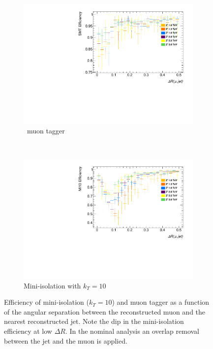 \begin{figure}[t]
\begin{subfigure}{0.49\linewidth}
  \centering
  \includegraphics[width=\textwidth]{PartBoosted/Plots/he_staco_smt_dr.pdf}
  \caption{\xsm\ muon tagger} \label{fig:BoostedSMTeffVsDRmuj}
\end{subfigure}
~
\begin{subfigure}{0.49\linewidth}
  \centering
  \includegraphics[width=\textwidth]{PartBoosted/Plots/he_muid_mi10_dr.pdf}
  \caption{Mini-isolation with $k_{T}=10$} \label{fig:BoostedMIeffVsDRmuj}
\end{subfigure}

\caption{Efficiency of mini-isolation ($k_{T}=10$) and \xsm muon tagger as a function of the angular separation between the reconstructed muon and the nearest reconstructed jet. Note the dip in the mini-isolation efficiency at low $\Delta R$. In the nominal analysis an overlap removal between the jet and the muon is applied.} \label{fig:BoostedEfficiencyVsDRmuj}
\end{figure}

